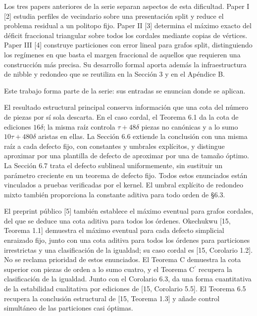 \documentclass[spanish,11pt,a4paper]{article}
\begin{document}
Los tres papers anteriores de la serie separan aspectos de esta dificultad. Paper I {[}2{]} estudia perfiles de vecindario sobre una presentación split y reduce el problema residual a un politopo fijo. Paper II {[}3{]} determina el máximo exacto del déficit fraccional triangular sobre todos los cordales mediante copias de vértices. Paper III {[}4{]} construye particiones con error lineal para grafos split, distinguiendo los regímenes en que basta el margen fraccional de aquellos que requieren una construcción más precisa. Su desarrollo formal aporta además la infraestructura de nibble y redondeo que se reutiliza en la Sección 3 y en el Apéndice B.

Este trabajo forma parte de la serie: sus entradas se enuncian donde se aplican.

El resultado estructural principal conserva información que una cota del número de piezas por sí sola descarta. En el caso cordal, el Teorema 6.1 da la cota de ediciones \(16\delta\); la misma raíz controla \(\tau+48\delta\) piezas no canónicas y a lo sumo \(10\tau+480\delta\) aristas en ellas. La Sección 6.6 extiende la conclusión con una misma raíz a cada defecto fijo, con constantes y umbrales explícitos, y distingue aproximar por una plantilla de defecto de aproximar por una de tamaño óptimo. La Sección 6.7 trata el defecto sublineal uniformemente, sin sustituir un parámetro creciente en un teorema de defecto fijo. Todos estos enunciados están vinculados a pruebas verificadas por el kernel. El umbral explícito de redondeo mixto también proporciona la constante aditiva para todo orden de §6.3.

El preprint público {[}5{]} también establece el máximo eventual para grafos cordales, del que se deduce una cota aditiva para todos los órdenes. Okechukwu {[}15, Teorema 1.1{]} demuestra el máximo eventual para cada defecto simplicial enraizado fijo, junto con una cota aditiva para todos los órdenes para particiones irrestrictas y una clasificación de la igualdad; su caso cordal es {[}15, Corolario 1.2{]}. No se reclama prioridad de estos enunciados. El Teorema C demuestra la cota superior con piezas de orden a lo sumo cuatro, y el Teorema \texorpdfstring{C\ensuremath{^{\prime}}}{C'} recupera la clasificación de la igualdad. Junto con el Corolario 6.3, da una forma cuantitativa de la estabilidad cualitativa por ediciones de {[}15, Corolario 5.5{]}. El Teorema 6.5 recupera la conclusión estructural de {[}15, Teorema 1.3{]} y añade control simultáneo de las particiones casi óptimas.
\end{document}
